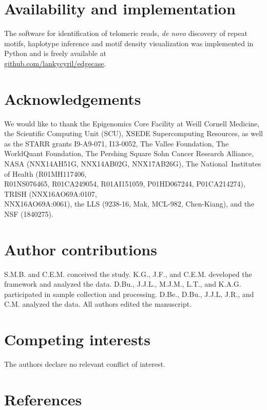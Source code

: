 \documentclass{article}
\begin{document}
\section*{Availability and implementation} 
The software for identification of telomeric reads, \textit{de novo} discovery of repeat motifs, haplotype inference and motif density visualization was implemented in Python and is freely available at \\ \href{https://github.com/lankycyril/edgecase}{github.com/lankycyril/edgecase}.

\section*{Acknowledgements} 
We would like to thank
the Epigenomics Core Facility at Weill Cornell Medicine,
the Scientific Computing Unit (SCU),
XSEDE Supercomputing Resources,
as well as
the STARR grants I9-A9-071, I13-0052,
The Vallee Foundation,
The WorldQuant Foundation,
The Pershing Square Sohn Cancer Research Alliance,
NASA (NNX14AH51G, NNX14AB02G, NNX17AB26G),
The National Institutes of Health (R01MH117406, \\ R01NS076465, R01CA249054, R01AI151059, P01HD067244, P01CA214274),
TRISH (NNX16AO69A:0107, \\ NNX16AO69A:0061),
the LLS (9238-16, Mak, MCL-982, Chen-Kiang),
and
the NSF (1840275).

\section*{Author contributions} 
S.M.B. and C.E.M. conceived the study.
K.G., J.F., and C.E.M. developed the framework and analyzed the data.
D.Bu., J.J.L., M.J.M., L.T., and K.A.G. participated in sample collection and processing.
D.Be., D.Bu., J.J.L, J.R., and C.M. analyzed the data.
All authors edited the manuscript.

\section*{Competing interests} 
The authors declare no relevant conflict of interest.

\section*{References} 
\begingroup \raggedright \singlespacing \printbibliography[heading=none] \endgroup
\end{document}
